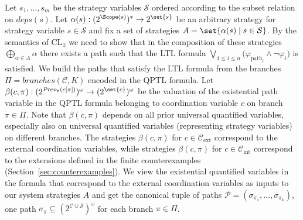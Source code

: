\documentclass{LMCS}
\newcommand{\deps}{\mathit{deps}}
\newcommand{\branches}{\mathit{branches}}
\newcommand{\Prev}{\mathit{Prev}}
\theoremstyle{plain}\newtheorem{theorem}[thm]{Theorem}
\theoremstyle{plain}\newtheorem{lemma}[thm]{Lemma}
\theoremstyle{plain}\newtheorem{proposition}[thm]{Proposition}
\theoremstyle{plain}\newtheorem{corollary}[thm]{Corollary}
\theoremstyle{definition}\newtheorem{definition}{Definition}[section]
\begin{document}
  Let $s_1,\dots,s_m$ be the strategy variables $\mathcal{S}$ ordered according to the subset relation on $\deps(s)$.
  Let $\alpha(s) : (2^{\Scope(s)})^* \rightarrow 2^\set{s}$ be an arbitrary strategy for strategy variable $s \in \mathcal{S}$ and fix a set of strategies $A = \set{\alpha(s) \mid s \in \mathcal{S}}$.
  By the semantics of CL$_\exists$ we need to show that in the composition of these strategies $\bigoplus_{\alpha \in A} \alpha$ there exists a path such that the LTL formula $\bigvee_{1 \leq i \leq n} \big( \varphi_{\text{path}_i} \land \neg\varphi_i \big)$ is satisfied.
  We build the paths that satisfy the LTL formula from the branches $\Pi = \branches(\mathcal{C},K)$ encoded in the QPTL formula.
  Let $\beta(c,\pi) : (2^{\Prev_\forall(c[\pi])})^\omega \rightarrow (2^\set{c})^\omega$ be the valuation of the existential path variable in the QPTL formula belonging to coordination variable $c$ on branch $\pi \in \Pi$.
  Note that $\beta(c,\pi)$ depends on all prior universal quantified variables, especially also on universal quantified variables (representing strategy variables) on different branches.
  The strategies $\beta(c,\pi)$ for $c \in \mathcal{C}_\text{ext}$ correspond to the external coordination variables, while strategies $\beta(c,\pi)$ for $c \in \mathcal{C}_\text{int}$ correspond to the extensions defined in the finite counterexamples (Section~\ref{sec:counterexamples}).
  We view the existential quantified variables in the formula that correspond to the external coordination variables as inputs to our system strategies $A$ and get the canonical tuple of paths $\mathcal{P} = (\sigma_{\pi_1},\dots,\sigma_{\pi_k})$, one path $\sigma_\pi \subseteq (2^{\mathcal{C} \cup \mathcal{S}})^\omega$ for each branch $\pi \in \Pi$.
        
\end{document}
